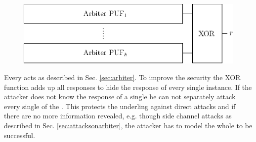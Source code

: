 \begin{figure}[ht]
\centering
\includegraphics[width=1.00\textwidth]{images/xor_arbiter.eps}
\caption{\xpuf}
\label{fig:xorarbiter}
\end{figure}

Every \apuf acts as described in Sec. \ref{sec:arbiter}. 
To improve the security the \ac{XOR} function adds up all responses to hide the response of every single \apuf instance.
If the attacker does not know the response of a single \apuf he can not separately attack every single \apuf of the \xpuf \cite{Becker2015ThePUFs}.
This protects the underling \apufs against direct attacks and if there are no more information revealed, e.g. though side channel attacks as described in Sec. \ref{sec:attacksonarbiter}, the attacker has to model the whole \xpuf to be successful.


